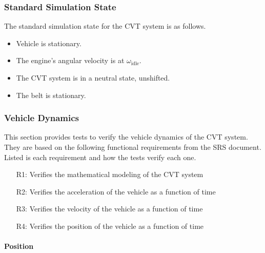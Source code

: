 \documentclass[12pt, titlepage]{article}
\begin{document}
\subsubsection*{Standard Simulation State}
\label{sec:standard_state}
The standard simulation state for the CVT system is as follows.
\begin{itemize}
  \item Vehicle is stationary.
  \item The engine's angular velocity is at $\omega_\text{idle}$.
  \item The CVT system is in a neutral state, unshifted.
  \item The belt is stationary.
\end{itemize}

\subsubsection{Vehicle Dynamics}

This section provides tests to verify the vehicle dynamics of the CVT system.
They are based on the following functional requirements from the SRS document.
Listed is each requirement and how the tests verify each one.
\begin{itemize}
  \item [R1:] Verifies the mathematical modeling of the CVT system
  \item [R2:] Verifies the acceleration of the vehicle as a function of time
  \item [R3:] Verifies the velocity of the vehicle as a function of time
  \item [R4:] Verifies the position of the vehicle as a function of time
\end{itemize}

\paragraph{Position}
\end{document}
